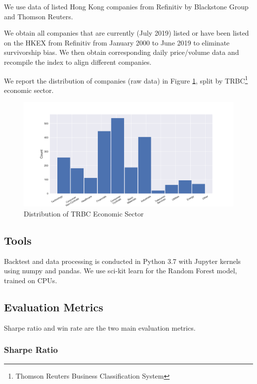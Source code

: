 \documentclass[12pt]{article}
\begin{document}
We use data of listed Hong Kong companies from Refinitiv by Blackstone Group and Thomson Reuters.

We obtain all companies that are currently (July 2019) listed or have been listed on the HKEX from Refinitiv from January 2000 to June 2019 to eliminate survivorship bias. We then obtain corresponding daily price/volume data and recompile the index to align different companies.

We report the distribution of companies (raw data) in Figure \ref{fig:sector_dist}, split by TRBC\footnote {Thomson Reuters Business Classification System} economic sector.

\begin{figure}[h]
  \begin{center}
    \includegraphics[width=1\linewidth]{figure/sector_dist.png}
  \end{center}
  \caption{Distribution of TRBC Economic Sector}
  \label{fig:sector_dist}
\end{figure}

\subsection{Tools}

Backtest and data processing is conducted in Python 3.7 with Jupyter kernels using numpy and pandas. We use sci-kit learn for the Random Forest model, trained on CPUs.

\subsection{Evaluation Metrics}

Sharpe ratio and win rate are the two main evaluation metrics.

\subsubsection{Sharpe Ratio}
\end{document}
